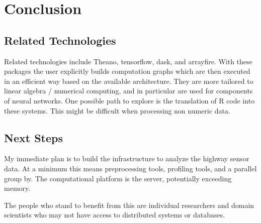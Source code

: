 \documentclass[12pt]{article}
\begin{document}
\section{Conclusion}



\subsection{Related Technologies}

Related technologies include Theano, tensorflow, dask, and arrayfire. With
these packages the user explicitly builds computation graphs which are then executed in
an efficient way based on the available architecture. They are more
tailored to linear algebra / numerical computing, and in particular are used for
components of neural networks. One possible path to explore is the translation
of R code into these systems. This might be difficult when processing non
numeric data.

\subsection{Next Steps}

My immediate plan is to build the infrastructure to analyze the highway
sensor data. At a minimum this means preprocessing tools, profiling tools, and
a parallel group by. The computational platform is the server, potentially
exceeding memory.

The people who stand to benefit from this are individual researchers and
domain scientists who may not have access to distributed systems or
databases. 


 
\end{document}
